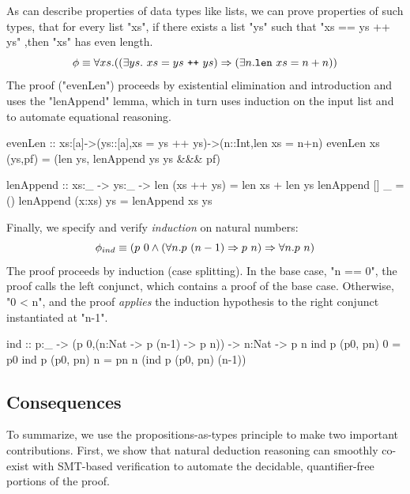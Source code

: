 
%
As \formula can describe properties
of data types like lists, we can prove
properties of such types, \eg that for
every list "xs", if there exists a list
"ys" such that "xs == ys ++ ys" ,then
"xs" has even length.
%
$$\phi \equiv \forall xs. ((\exists ys.\ xs = ys \ \texttt{++}\ ys) \Rightarrow (\exists n. \texttt{len}\ xs = n + n))$$
%
The proof ("evenLen") proceeds by existential elimination and introduction
and uses the "lenAppend" lemma, which in turn uses induction on the
input list and \pbesym to automate equational reasoning.
%
\begin{code}
    evenLen :: xs:[a]->(ys::[a],{xs = ys ++ ys})->(n::Int,{len xs = n+n})
    evenLen xs (ys,pf) = (len ys, lenAppend ys ys &&& pf)

    lenAppend :: xs:_ -> ys:_ -> {len (xs ++ ys) = len xs + len ys}
    lenAppend []     _  = ()
    lenAppend (x:xs) ys = lenAppend xs ys
\end{code}

%
Finally, we specify and verify \emph{induction} on natural numbers:
%
$$
\phi_{ind} \equiv  (p\ 0 \land (\forall n. p\ (n-1) \Rightarrow p\ n) \Rightarrow \forall n. p\ n)
$$
%
The proof proceeds by induction (\eg case splitting).
%
In the base case, "n == 0", the proof calls the left conjunct, which contains a proof of the base case.
%
Otherwise, "0 < n", and the proof \emph{applies} the induction hypothesis to the right conjunct instantiated at "n-1".
%
\begin{code}
    ind :: p:_ -> ({p 0},(n:Nat -> {p (n-1)} -> {p n})) -> n:Nat -> {p n}
    ind p (p0, pn) 0 = p0
    ind p (p0, pn) n = pn n (ind p (p0, pn) (n-1))
\end{code}



\subsection{Consequences}
%
To summarize, we use the propositions-as-types
principle to make two important contributions.
%
First, we show that natural deduction reasoning
can smoothly co-exist with SMT-based verification
to automate the decidable, quantifier-free portions
of the proof.
%




